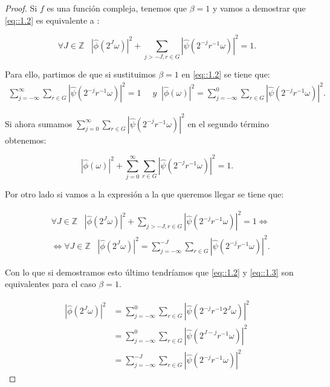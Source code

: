 \begin{proof}
\noindent Si $f$ es una función compleja, tenemos que $\beta=1$ y vamos a demostrar que \eqref{eq::1.2} es equivalente a : 

\begin{equation} \label{eq::1.3}
  \forall J \in \mathbb{Z} \; \; \; \left|\widehat{\phi}\left(2^J\omega\right)\right|^2 + \sum_{j>-J,r\in G}\left|\widehat{\psi}\left(2^{-j}r^{-1}\omega\right)\right|^2=1.
\end{equation}

\noindent Para ello, partimos de que si sustituimos $\beta=1$ en \eqref{eq::1.2} se tiene que: 
     \begin{align*}
        \sum_{j=-\infty}^\infty \sum_{r \in G} |\widehat{\psi}(2^{-j}r^{-1}\omega)|^2=1 & \; \; y
        \;\;|\widehat{\phi}(\omega)|^2= \sum_{j=-\infty}^0 \sum_{r\in G} |\widehat{\psi}(2^{-j}r^{-1}\omega)|^2.
    \end{align*}

\noindent Si ahora sumamos $\sum_{j=0}^{\infty} \sum_{r\in G} |\widehat{\psi}(2^{-j}r^{-1}\omega)|^2$ en el segundo término obtenemos: 

$$|\widehat{\phi}(\omega)|^2 + \sum_{j=0}^{\infty} \sum_{r\in G} |\widehat{\psi}(2^{-j}r^{-1}\omega)|^2=1.$$

\noindent Por otro lado si vamos a la expresión a la que queremos llegar se tiene que: 

\begin{align*}
  &\forall J \in \mathbb{Z} \; \; \; \left|\widehat{\phi}\left(2^J\omega\right)\right|^2 + \sum_{j>-J,r\in G}\left|\widehat{\psi}\left(2^{-j}r^{-1}\omega\right)\right|^2=1 \iff \\
  &\iff \forall J \in \mathbb{Z} \; \; \; \left|\widehat{\phi}\left(2^J\omega\right)\right|^2=\sum_{j=-\infty}^{-J} \sum_{r\in G} |\widehat{\psi}(2^{-j}r^{-1}\omega)|^2.
\end{align*}

\noindent Con lo que si demostramos esto último tendríamos que \eqref{eq::1.2} y \eqref{eq::1.3} son equivalentes para el caso $\beta=1$. 


     \begin{align*}
        \left|\widehat{\phi}\left(2^J\omega\right)\right|^2 & =\sum_{j=-\infty}^{0} \sum_{r\in G} |\widehat{\psi}(2^{-j}r^{-1}2^J\omega)|^2 \\
        & = \sum_{j=-\infty}^{0} \sum_{r\in G} |\widehat{\psi}(2^{J-j}r^{-1}\omega)|^2  \\
        & =\sum_{j=-\infty}^{-J} \sum_{r\in G} |\widehat{\psi}(2^{-j}r^{-1}\omega)|^2  
    \end{align*}
    

\end{proof}
